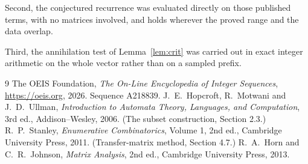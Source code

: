 \documentclass[11pt,a4paper]{article}
\theoremstyle{plain}
\theoremstyle{definition}
\begin{document}
Second, the conjectured recurrence was evaluated directly on those published terms, with no
matrices involved, and holds wherever the proved range and the data overlap.

Third, the annihilation test of Lemma~\ref{lem:crit} was carried out in exact integer
arithmetic on the whole vector rather than on a sampled prefix.

\begin{thebibliography}{9}
 The OEIS Foundation, \emph{The On-Line Encyclopedia of Integer
Sequences}, \url{https://oeis.org}, 2026. Sequence A218839.
 J.~E.~Hopcroft, R.~Motwani and J.~D.~Ullman, \emph{Introduction to Automata
Theory, Languages, and Computation}, 3rd ed., Addison--Wesley, 2006. (The subset
construction, Section 2.3.)
 R.~P.~Stanley, \emph{Enumerative Combinatorics}, Volume 1, 2nd ed.,
Cambridge University Press, 2011. (Transfer-matrix method, Section 4.7.)
 R.~A.~Horn and C.~R.~Johnson, \emph{Matrix Analysis}, 2nd ed., Cambridge
University Press, 2013.
\end{thebibliography}
\end{document}

